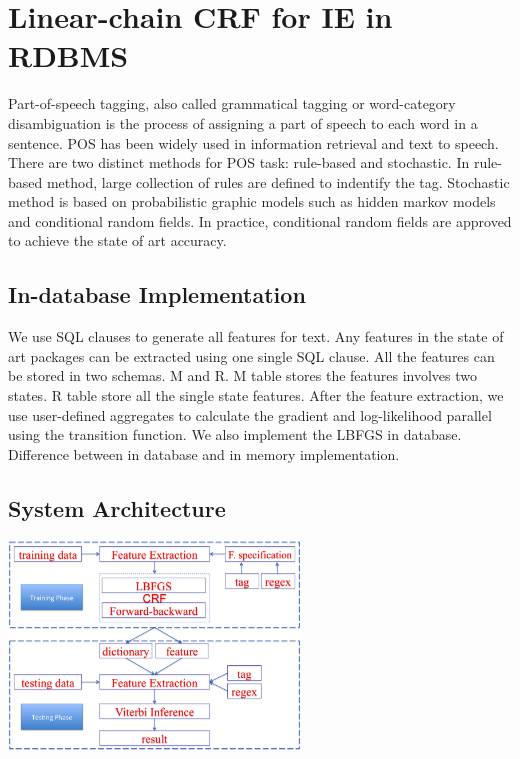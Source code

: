 \documentclass[11pt,letterpaper]{article}
\begin{document}
\section{Linear-chain CRF for IE in RDBMS}
Part-of-speech tagging, also called grammatical tagging or word-category disambiguation is the process of assigning 
a part of speech to each word in a sentence. POS has been widely used in information retrieval and text to speech. 
There are two distinct methods for 
POS task: rule-based and stochastic.
In rule-based method, large collection of rules are defined to indentify the tag. Stochastic method is based on 
probabilistic graphic models such as hidden markov models and conditional random fields. In practice, 
conditional random fields are approved to achieve the state of art accuracy.


\subsection{In-database Implementation}
We use SQL clauses to generate all features for text. Any features in the state of art packages can be extracted using one single SQL clause.
All the features can be stored in two schemas. M and R. M table stores the features involves two states. R table store all the single state features.
After the feature extraction, we use user-defined aggregates to calculate the gradient and log-likelihood parallel using the transition function.
We also implement the LBFGS in database. Difference between in database and in memory implementation.
  
\subsection{System Architecture}
\begin{center}
\includegraphics[height=15em]{system.png}
\end{center}
\end{document}

